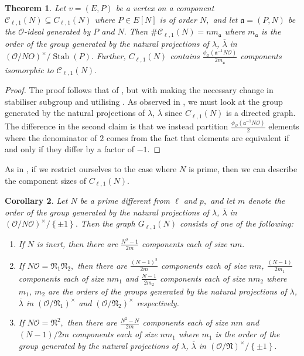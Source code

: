 \documentclass[11pt,a4paper]{amsart}
\theoremstyle{plain}
\newtheorem{thm}{Theorem}[section]
\newtheorem{cor}[thm]{Corollary}
\theoremstyle{definition}
\theoremstyle{remark}
\DeclareMathOperator{\Stab}{Stab}
\begin{document}
\begin{thm}\label{thm:crater-structure-1}
  Let $v = (E, P)$ be a vertex on a component $\mathcal{C}_{\ell,1}(N) \subseteq C_{\ell,1}(N)$ where $P \in E[N]$ is of order $N,$ and let $\mathfrak{a} = (P, N)$ be the $\mathcal{O}$-ideal generated by $P$ and $N.$ Then $\#\mathcal{C}_{\ell,1}(N) = nm_{\mathfrak{a}}$ where $m_{\mathfrak{a}}$ is the order of the group generated by the natural projections of $\lambda$, $\overline{\lambda}$ in $(\mathcal{O}/NO)^{\times}/\Stab(P).$ Further,  $C_{\ell,1}(N)$ contains $\frac{\phi_{\mathcal{O}}(\mathfrak{a}^{-1}N \mathcal{O})}{2m_{\mathfrak{a}}}$ components isomorphic to $\mathcal{C}_{\ell,1}(N).$
\end{thm}
\begin{proof}
  The proof follows that of , but with making the necessary change in stabiliser subgroup and utilising . As observed in , we must look at the group generated by the natural projections of $\lambda$, $\overline{\lambda}$ since $C_{\ell,1}(N)$ is a directed graph. The difference in the second claim is that we instead partition $\frac{\phi_{\mathcal{O}}(\mathfrak{a}^{-1}N \mathcal{O})}{2}$ elements where the denominator of $2$ comes from the fact that elements are equivalent if and only if they differ by a factor of $-1.$
\end{proof}
As in , if we restrict ourselves to the case where $N$ is prime, then we can describe the component sizes of  $C_{\ell,1}(N).$
\begin{cor}\label{cor:crater-structure-1}
  Let $N$ be a prime different from $\ell$ and $p,$ and let $m$ denote the order of the group generated by the natural projections of $\lambda$, $\overline{\lambda}$ in $(\mathcal{O}/N \mathcal{O})^{\times}/\left\{ \pm 1 \right\}.$ Then the graph $G_{\ell,1}(N)$ consists of one of the following:
  \begin{enumerate}[label=(\roman*)]
  \item If $N$ is inert, then there are $\frac{N^2-1}{2m}$ components each of size $nm.$
  \item If $N\mathcal{O} = \mathfrak{N}_1 \mathfrak{N}_2,$ then there are $\frac{(N-1)^2}{2m}$ components each of size $nm$, $\frac{(N-1)}{2m_1}$ components each of size $nm_1$ and $\frac{N-1}{2m_2}$ components each of size $nm_2$ where $m_1$, $m_2$ are the orders of the groups generated by the natural projections of $\lambda$, $\overline{\lambda}$ in $(\mathcal{O}/\mathfrak{N}_1)^{\times}$ and $(\mathcal{O}/\mathfrak{N}_2)^{\times}$ respectively.
  \item If $N\mathcal{O} = \mathfrak{N}^2,$ then there are $\frac{N^2-N}{2m}$ components each of size $nm$ and $(N-1)/2m$ components each of size $nm_1$ where $m_1$ is the order of the group generated by the natural projections of $\lambda$, $\overline{\lambda}$ in $(\mathcal{O}/\mathfrak{N})^{\times}/\left\{ \pm 1 \right\}.$
  \end{enumerate}
\end{cor}
\end{document}
